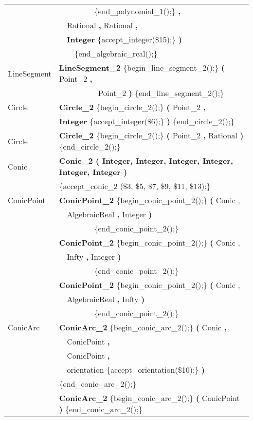 \begin{tabular}{*{2}{| l} |}
              & \ \ \ \ \ \ \ \ \ \{end\_polynomial\_1();\} {\bf \Large ,}         \\
              & \ \ Rational {\bf \Large ,} Rational {\bf \Large ,}  \\
              & \ \ {\bf Integer} \{accept\_integer(\$15);\} {\bf \Large )} \\
              & \ \ \ \ \{end\_algebraic\_real();\} \\ \hline          
LineSegment &  {\bf LineSegment\_2} \{begin\_line\_segment\_2();\} {\bf \Large (} Point\_2 {\bf \Large ,} \\
            & \ \ \ \ \ \ \ \ \ \  Point\_2 {\bf \Large )} \{end\_line\_segment\_2();\}\\ \hline
Circle   &  {\bf Circle\_2} \{begin\_circle\_2();\} {\bf \Large (} Point\_2 {\bf \Large ,} \\
         & {\bf Integer} \{accept\_integer(\$6);\} {\bf \Large )} \{end\_circle\_2();\} \\ 
Circle   &  {\bf Circle\_2} \{begin\_circle\_2();\} {\bf \Large (} Point\_2 {\bf \Large ,} Rational {\bf \Large )} \{end\_circle\_2();\} \\ \hline
Conic    & {\bf Conic\_2 ( Integer, Integer, Integer, Integer, Integer, Integer )} \\
              & \{accept\_conic\_2 (\$3, \$5, \$7, \$9, \$11, \$13);\}\\ \hline
ConicPoint    & {\bf ConicPoint\_2} \{begin\_conic\_point\_2();\} {\bf (} Conic ,            \\
              & \ \ AlgebraicReal {\bf \Large ,} Integer {\bf \Large )}  \\
              & \ \ \ \ \ \ \ \ \ \{end\_conic\_point\_2();\}\\ 
              & {\bf ConicPoint\_2} \{begin\_conic\_point\_2();\} {\bf (} Conic ,            \\
              & \ \ Infty {\bf \Large ,} Integer {\bf \Large )}  \\
              & \ \ \ \ \ \ \ \ \ \{end\_conic\_point\_2();\}\\ 
 & {\bf ConicPoint\_2} \{begin\_conic\_point\_2();\} {\bf (} Conic ,            \\
              & \ \ AlgebraicReal {\bf \Large ,} Infty {\bf \Large )}  \\
              & \ \ \ \ \ \ \ \ \ \{end\_conic\_point\_2();\}\\ \hline
ConicArc      & {\bf ConicArc\_2} \{begin\_conic\_arc\_2();\} {\bf \Large (} Conic {\bf \Large ,}   \\
              & \ \ ConicPoint {\bf \Large ,}                    \\
              & \ \ ConicPoint {\bf \Large ,}                    \\
              & \ \ orientation \{accept\_orientation(\$10);\} {\bf \Large )}                  \\
              & \{end\_conic\_arc\_2();\}\\
              & {\bf ConicArc\_2} \{begin\_conic\_arc\_2();\} {\bf \Large (} ConicPoint {\bf \Large )} \{end\_conic\_arc\_2();\}\\ \hline 
              

\end{tabular}
